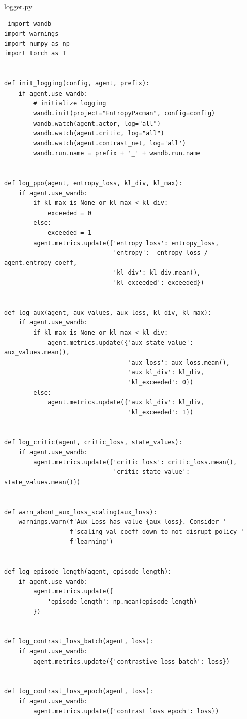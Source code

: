 \documentclass{article}
\begin{document}
logger.py
\begin{lstlisting}
 import wandb
import warnings
import numpy as np
import torch as T


def init_logging(config, agent, prefix):
    if agent.use_wandb:
        # initialize logging
        wandb.init(project="EntropyPacman", config=config)
        wandb.watch(agent.actor, log="all")
        wandb.watch(agent.critic, log="all")
        wandb.watch(agent.contrast_net, log='all')
        wandb.run.name = prefix + '_' + wandb.run.name


def log_ppo(agent, entropy_loss, kl_div, kl_max):
    if agent.use_wandb:
        if kl_max is None or kl_max < kl_div:
            exceeded = 0
        else:
            exceeded = 1
        agent.metrics.update({'entropy loss': entropy_loss,
                              'entropy': -entropy_loss / agent.entropy_coeff,
                              'kl div': kl_div.mean(),
                              'kl_exceeded': exceeded})


def log_aux(agent, aux_values, aux_loss, kl_div, kl_max):
    if agent.use_wandb:
        if kl_max is None or kl_max < kl_div:
            agent.metrics.update({'aux state value': aux_values.mean(),
                                  'aux loss': aux_loss.mean(),
                                  'aux kl_div': kl_div,
                                  'kl_exceeded': 0})
        else:
            agent.metrics.update({'aux kl_div': kl_div,
                                  'kl_exceeded': 1})


def log_critic(agent, critic_loss, state_values):
    if agent.use_wandb:
        agent.metrics.update({'critic loss': critic_loss.mean(),
                              'critic state value': state_values.mean()})


def warn_about_aux_loss_scaling(aux_loss):
    warnings.warn(f'Aux Loss has value {aux_loss}. Consider '
                  f'scaling val_coeff down to not disrupt policy '
                  f'learning')


def log_episode_length(agent, episode_length):
    if agent.use_wandb:
        agent.metrics.update({
            'episode_length': np.mean(episode_length)
        })


def log_contrast_loss_batch(agent, loss):
    if agent.use_wandb:
        agent.metrics.update({'contrastive loss batch': loss})


def log_contrast_loss_epoch(agent, loss):
    if agent.use_wandb:
        agent.metrics.update({'contrast loss epoch': loss})



\end{lstlisting}
\end{document}

